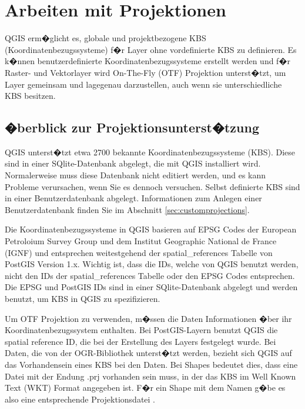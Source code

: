 
\chapter{Arbeiten mit Projektionen}\label{label_projections}


QGIS erm�glicht es, globale und projektbezogene KBS (Koordinatenbezugssysteme)
f�r Layer ohne vordefinierte KBS zu definieren. Es k�nnen benutzerdefinierte
Koordinatenbezugssysteme erstellt werden und f�r Raster- und Vektorlayer wird 
On-The-Fly (OTF) Projektion unterst�tzt, um Layer gemeinsam und lagegenau 
darzustellen, auch wenn sie unterschiedliche KBS besitzen. 

\section{�berblick zur Projektionsunterst�tzung}\label{label_projoverview}

QGIS unterst�tzt etwa 2700 bekannte Koordinatenbezugssysteme (KBS). Diese
sind in einer SQlite-Datenbank abgelegt, die mit QGIS installiert wird.
Normalerweise muss diese Datenbank nicht editiert werden, und es kann
Probleme verursachen, wenn Sie es dennoch versuchen. Selbst definierte KBS
sind in einer Benutzerdatenbank abgelegt. Informationen zum Anlegen einer
Benutzerdatenbank finden Sie im Abschnitt \ref{sec:customprojections}.

Die Koordinatenbezugssysteme in QGIS basieren auf EPSG Codes der 
European Petroloium Survey Group und dem Institut Geographic National de 
France (IGNF) und entsprechen weitestgehend der spatial\_references 
Tabelle von PostGIS Version 1.x. Wichtig ist, dass die IDs, 
welche von QGIS benutzt werden, nicht den IDs der spatial\_references Tabelle 
oder den EPSG Codes entsprechen. Die EPSG und PostGIS IDs sind in einer 
SQlite-Datenbank abgelegt und werden benutzt, um KBS in QGIS zu spezifizieren.

Um OTF Projektion zu verwenden, m�ssen die Daten Informationen �ber ihr
Koordinatenbezugssystem enthalten. Bei PostGIS-Layern benutzt QGIS die spatial
reference ID, die bei der Erstellung des Layers festgelegt wurde. Bei Daten,
die von der OGR-Bibliothek unterst�tzt werden, bezieht sich QGIS auf das
Vorhandensein eines KBS bei den Daten. Bei Shapes bedeutet dies, dass eine
Datei mit der Endung .prj vorhanden sein muss, in der das KBS im Well
Known Text (WKT) Format angegeben ist. F�r ein Shape mit dem Namen
 g�be es also eine entsprechende Projektionsdatei
. 

